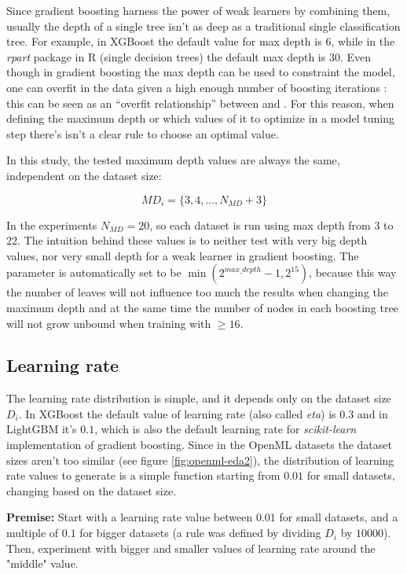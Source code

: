 Since gradient boosting harness the power of weak learners by combining them, usually the depth of a single tree isn't as deep as a traditional single classification tree. For example, in XGBoost the default value for max depth is $6$, while in the \textit{rpart} package in R (single decision trees) the default max depth is $30$. Even though in gradient boosting the max depth can be used to constraint the model, one can overfit in the data given a high enough number of boosting iterations : this can be seen as an ``overfit relationship'' between  and . For this reason, when defining the maximum depth or which values of it to optimize in a model tuning step there's isn't a clear rule to choose an optimal value. 

In this study, the tested maximum depth values are always the same, independent on the dataset size:

$$MD_i = \{3, 4, ..., N_{MD} + 3\}$$

In the experiments $N_{MD} = 20$, so each dataset is run using max depth from $3$ to $22$. The intuition behind these values is to neither test with very big depth values, nor very small depth for a weak learner in gradient boosting. The  parameter is automatically set to be $\min(2^{max\_depth} - 1, 2^{15})$, because this way the number of leaves will not influence too much the results when changing the maximum depth and at the same time the number of nodes in each boosting tree will not grow unbound when training with  $\geq 16$.

\subsection{Learning rate}

The learning rate distribution is simple, and it depends only on the dataset size $D_i$. In XGBoost the default value of learning rate (also called \textit{eta}) is $0.3$ and in LightGBM it's $0.1$, which is also the default learning rate for \textit{scikit-learn} implementation of gradient boosting. Since in the OpenML datasets the dataset sizes aren't too similar (see figure \ref{fig:openml-eda2}), the distribution of learning rate values to generate is a simple function starting from $0.01$ for small datasets, changing based on the dataset size.

\textbf{Premise:} Start with a learning rate value between $0.01$ for small datasets, and a multiple of $0.1$ for bigger datasets (a rule was defined by dividing $D_i$ by $10000$). Then, experiment with bigger and smaller values of learning rate around the "middle" value.

